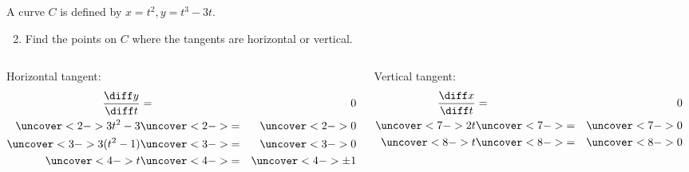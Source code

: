 \begin{frame}[t]
\begin{example}
A curve $C$ is defined by $x = t^2, y = t^3 - 3t$.
\begin{enumerate}
\setcounter{enumi}{1}
\item  Find the points on $C$ where the tangents are horizontal or vertical.
\end{enumerate}
\begin{columns}[t]
Horizontal tangent:
\abovedisplayskip=0pt
\belowdisplayskip=0pt
\begin{eqnarray*}
\frac{\diff y}{\diff t} & = & 0\\
\uncover<2->{%
3t^2 - 3%
}%
& \uncover<2->{ = } & %
\uncover<2->{%
0
}\\%
\uncover<3->{%
3(t^2 - 1)%
}%
& \uncover<3->{ = } & %
\uncover<3->{%
0
}\\%
\uncover<4->{%
t%
}%
& \uncover<4->{ = } & %
\uncover<4->{%
\pm 1%
}%
\end{eqnarray*}

%
Vertical tangent:
\abovedisplayskip=0pt
\belowdisplayskip=0pt
\begin{eqnarray*}
\frac{\diff x}{\diff t} & = & 0\\
\uncover<7->{%
2t%
}%
& \uncover<7->{ = } & %
\uncover<7->{%
0%
}\\%
\uncover<8->{%
t%
}%
& \uncover<8->{ = } & %
\uncover<8->{%
0%
}%
\end{eqnarray*}

%
\end{columns}
\end{example}
\end{frame}



